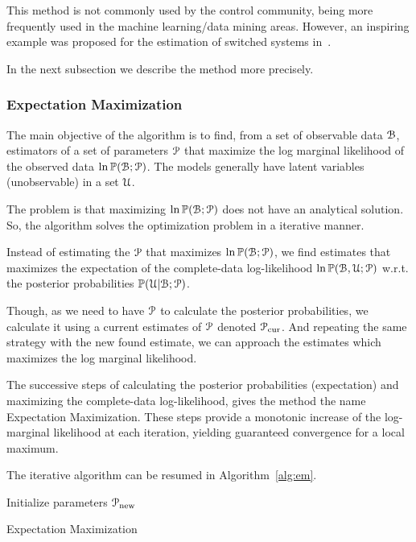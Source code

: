\documentclass[../main.tex]{subfiles}
\begin{document}
This method is not commonly used by the control community, being more frequently used in the machine learning/data mining areas.
However, an inspiring example was proposed for the estimation of switched systems in~\cite{NakadaEtAl2005}.

In the next subsection we describe the method more precisely.

\subsubsection{Expectation Maximization}
The main objective of the \EM{} algorithm is to find, from a set of observable data $\mathcal{B}$, estimators of a set of parameters $\mathcal{P}$ that maximize the log marginal likelihood of the observed data ${\ln\mathbb{P}(\mathcal{B};\mathcal{P})}$. The models generally have latent variables (unobservable) in a set $\mathcal{U}$.

The problem is that maximizing ${\ln\mathbb{P}(\mathcal{B};\mathcal{P})}$ does not have an analytical solution.
So, the algorithm solves the optimization problem in a iterative manner.

Instead of estimating the $\mathcal{P}$ that maximizes ${\ln\mathbb{P}(\mathcal{B};\mathcal{P})}$, we find estimates that maximizes the expectation of the complete-data log-likelihood $\ln\mathbb{P}(\mathcal{B},\mathcal{U};\mathcal{P})$ w.r.t.
the posterior probabilities ${\mathbb{P}(\mathcal{U}|\mathcal{B};\mathcal{P})}$.

Though, as we need to have $\mathcal{P}$ to calculate the posterior probabilities, we
calculate it using a current estimates of $\mathcal{P}$ denoted $\mathcal{P}_{\mathrm{cur}}$.
And repeating the same strategy with the new found estimate, we can approach the estimates which maximizes the log marginal likelihood.

The successive steps of calculating the posterior probabilities (expectation) and maximizing the complete-data log-likelihood, gives the method the name Expectation Maximization.
These steps provide a monotonic increase of the log-marginal likelihood at each iteration, yielding guaranteed convergence for a local maximum.

The iterative algorithm can be resumed in Algorithm~\ref{alg:em}.

\begin{algorithm2e}[h]
  \DontPrintSemicolon%
  Initialize parameters $\mathcal{P}_{\mathrm{new}}$\;
 \caption{Expectation Maximization}\label{alg:em}
\end{algorithm2e}
\end{document}
